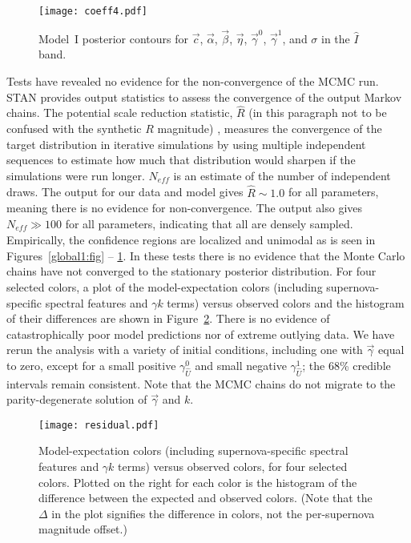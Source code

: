 \documentclass{aastex61}   	%
\begin{document}
\begin{figure}[htbp] %
   \centering
         \texttt{[image: coeff4.pdf]} 
            \caption{Model~I posterior contours for  $\vec{c}$, $\vec{\alpha}$, $\vec{\beta}$, $\vec{\eta}$, $\vec{\gamma}^0$, $\vec{\gamma}^1$, and $\sigma$ in the ${\hat{I}}$ band.
 \label{global5:fig}}
\end{figure}

Tests have revealed no evidence for the non-convergence of the MCMC run.
STAN provides output statistics to assess
the convergence of the output Markov chains.
The 
potential scale reduction statistic, $\hat{R}$
(in this paragraph not to be confused with the synthetic $R$ magnitude)
\citep{Gelman92}, measures the convergence of the target distribution
in iterative simulations 
by using multiple independent sequences to estimate how much that distribution would sharpen if the simulations were run longer.
$N_{\mathit{eff}}$ is an estimate of the number of independent draws. The output for our data and model gives $\hat{R} \sim 1.0$ for all parameters, meaning there is no evidence for non-convergence.  The
output also gives  $N_{\mathit{eff}} \gg 100$ for all parameters, indicating that all are densely sampled.
Empirically, the confidence regions are localized and unimodal as is seen in  Figures~\ref{global1:fig} -- \ref{global5:fig}.  In these tests there is no evidence that
the Monte Carlo chains have not converged to the stationary posterior distribution.
For four selected colors, a plot of the
\color{red}
model-expectation colors (including  supernova-specific spectral features and $\gamma k$ terms)
\color{black}
 versus observed colors and the histogram of their differences
are shown in Figure~\ref{residual:fig}. 
There is no evidence of catastrophically poor model predictions nor of extreme
outlying data.
We have rerun the analysis with a variety of initial conditions, including one with $\vec{\gamma}$ equal to zero, except for a small positive 
\color{red}
$\gamma^0_{\hat{U}}$ and small negative $\gamma^1_{\hat{U}}$;
\color{black}
the 68\% credible intervals
remain consistent.  Note that the MCMC chains do not migrate to the parity-degenerate solution of $\vec{\gamma}$ and $k$. 

\begin{figure}[htbp] %
   \centering
   \texttt{[image: residual.pdf]} 
            \caption{
            \color{red}
            Model-expectation colors (including  supernova-specific spectral features and $\gamma k$ terms)
            versus observed colors, for four selected colors. 
            \color{black}
            Plotted on the right for each color
is the histogram of the difference between the expected and
observed
 colors.            \color{red}
(Note that the $\Delta$ in the plot signifies the difference in colors, not the per-supernova magnitude offset.)
            \color{black}
            \label{residual:fig}}
\end{figure}
\end{document}
